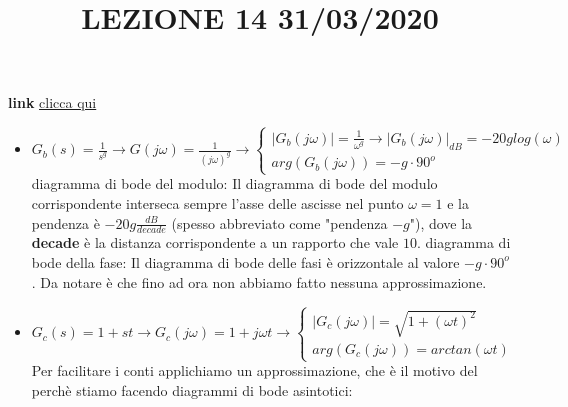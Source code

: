 \title{LEZIONE 14 31/03/2020}\newline
\textbf{link} \href{https://web.microsoftstream.com/video/22a546ac-3e6b-43e0-b0f9-45a630661700?list=user&userId=faa91214-a6f5-40d7-8875-253fd49b8ce1}{clicca qui}
\begin{itemize}
    \item $G_b(s)= \frac{1}{s^g} \rightarrow G(j \omega) = \frac{1}{(j \omega)^g} \rightarrow \begin{cases}
        |G_b(j \omega)| = \frac{1}{\omega^g} \rightarrow |G_b(j \omega)|_{dB}= - 20 g log(\omega)\\
        arg(G_b(j \omega)) = - g \cdot 90^o
    \end{cases} $\newline \newline
    diagramma di bode del modulo: Il diagramma di bode del modulo corrispondente interseca sempre l'asse delle ascisse nel punto $\omega = 1$ e la pendenza è $-20g \frac{dB}{decade}$ (spesso abbreviato come "pendenza $-g$"), dove la \textbf{decade} è la distanza corrispondente a un rapporto che vale $10$.\newline \newline
    diagramma di bode della fase: Il diagramma di bode delle fasi è orizzontale al valore $-g \cdot 90^o$.\newline \newline
    Da notare è che fino ad ora non abbiamo fatto nessuna approssimazione.
    \item $G_c(s)= 1 + st \rightarrow  G_c(j \omega) = 1 + j \omega t \rightarrow \begin{cases}
        |G_c(j \omega)| = \sqrt{1 + (\omega t)^2}\\
        arg(G_c(j \omega))= arctan(\omega t)
    \end{cases}$\newline
    Per facilitare i conti applichiamo un approssimazione, che è il motivo del perchè stiamo facendo diagrammi di bode asintotici:
\end{itemize}
